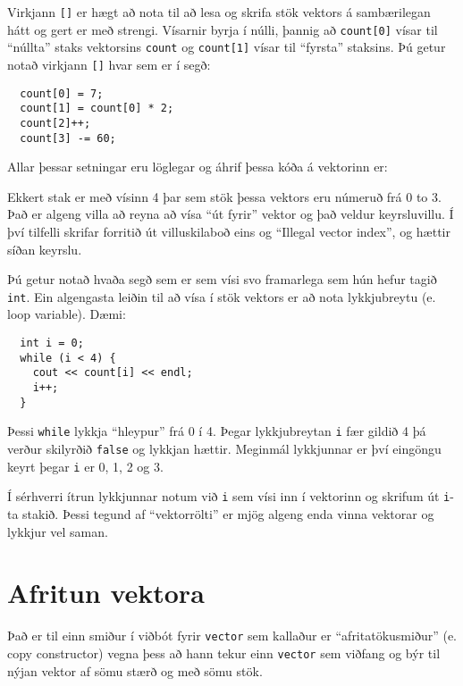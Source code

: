 Virkjann {\tt []} er hægt að nota til að lesa og skrifa stök vektors á sambærilegan hátt og gert er með strengi.
Vísarnir byrja í núlli, þannig að {\tt count[0]} vísar til ``núllta'' staks vektorsins {\tt count} og
{\tt count[1]} vísar til ``fyrsta'' staksins.
Þú getur notað virkjann {\tt []} hvar sem er í segð:

\begin{verbatim}
  count[0] = 7;
  count[1] = count[0] * 2;
  count[2]++;
  count[3] -= 60;
\end{verbatim}
%
Allar þessar setningar eru löglegar og áhrif þessa kóða á vektorinn er: 

\vspace{0.1in}
\centerline{}
\vspace{0.1in}

Ekkert stak er með vísinn 4 þar sem stök þessa vektors eru númeruð frá 0 to 3.
Það er algeng villa að reyna að vísa ``út fyrir'' vektor og það veldur keyrsluvillu.
Í því tilfelli skrifar forritið út villuskilaboð eins og ``Illegal vector index'', og hættir síðan keyrslu.


Þú getur notað hvaða segð sem er sem vísi svo framarlega sem hún hefur tagið {\tt int}.
Ein algengasta leiðin til að vísa í stök vektors er að nota lykkjubreytu (e. loop variable).
Dæmi:

\begin{verbatim}
  int i = 0;
  while (i < 4) {
    cout << count[i] << endl;
    i++;
  }
\end{verbatim}
%
Þessi {\tt while} lykkja ``hleypur'' frá 0 í 4.
Þegar lykkjubreytan {\tt i} fær gildið 4 þá verður skilyrðið {\tt false} og lykkjan hættir.
Meginmál lykkjunnar er því eingöngu keyrt þegar {\tt i} er 0, 1, 2 og 3.


Í sérhverri ítrun lykkjunnar notum við {\tt i} sem vísi inn í vektorinn og skrifum út {\tt i}-ta stakið.
Þessi tegund af ``vektorrölti'' er mjög algeng enda vinna vektorar og lykkjur vel saman.

\section{Afritun vektora}

Það er til einn smiður í viðbót fyrir {\tt vector} sem kallaður er ``afritatökusmiður'' (e. copy constructor)
vegna þess að hann tekur einn {\tt vector} sem viðfang og býr til nýjan vektor af sömu stærð og með sömu stök.

